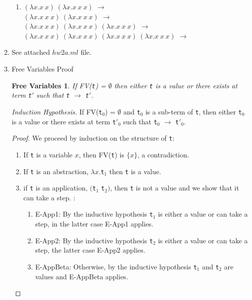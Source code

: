 \documentclass{article}
\newtheorem{free}{Free Variables}
\begin{document}
\begin{enumerate}
\begin{enumerate}
    \item $(\lambda x.x\ x)\ (\lambda x.x\ x\ x)$ $\longrightarrow$ \\
      $(\lambda x.x\ x\ x)\ (\lambda x.x\ x\ x)$ $\longrightarrow$ \\
      $(\lambda x.x\ x\ x)\ (\lambda x.x\ x\ x)\ (\lambda x.x\ x\ x)$
      $\longrightarrow$ \\
      $(\lambda x.x\ x\ x)\ (\lambda x.x\ x\ x)\ (\lambda x.x\ x\ x)\ (\lambda x.x\ x\ x)$ $\longrightarrow$ \bot


    \end{enumerate}

  \item{See attached $hw2a.ml$ file.}

  \item{Free Variables Proof}
    \begin{free}
      If FV(\verb|t|) = $\emptyset$ then either \verb|t| is a value or there exists at term \verb|t|$'$ such that \verb|t| $\longrightarrow$ \verb|t|$'$.
    \end{free}

    \textit{Induction Hypothesis.} If FV(\verb|t|$_0$) = $\emptyset$ and \verb|t|$_0$ is a sub-term of \verb|t|, then either \verb|t|$_0$ is a value or there exists at term \verb|t|$'_0$ such that \verb|t|$_0$ $\longrightarrow$ \verb|t|$'_0$.


    \begin{proof}
      We proceed by induction on the structure of \verb|t|:
      \begin{enumerate}
      \item If \verb|t| is a variable $x$, then FV(\verb|t|) is $\{x\}$, a contradiction.
      \item If \verb|t| is an abstraction, $\lambda x.$\verb|t|$_1$ then \verb|t| is a value.
      \item if \verb|t| is an application, $($\verb|t|$_1$ \verb|t|$_2)$, then \verb|t| is not a value and we show that it can take a step. :
        \begin{enumerate}
        \item E-App1: By the inductive hypothesis \verb|t|$_1$ is either a value or
          can take a step, in the latter case E-App1 applies.
        \item E-App2: By the inductive hypothesis \verb|t|$_2$ is either a value or can take a step, the latter case E-App2 applies.
        \item E-AppBeta: Otherwise, by the inductive hypothesis \verb|t|$_1$ and \verb|t|$_2$ are values and E-AppBeta applies.
        \end{enumerate}
      \end{enumerate}
    \end{proof}


\end{enumerate}
\end{document}
